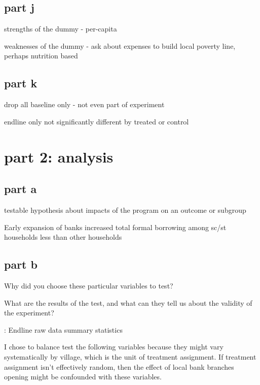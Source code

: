 \documentclass[12pt]{article}
\begin{document}
\subsection{part j}

strengths of the dummy
- per-capita


weaknesses of the dummy
- ask about expenses to build local poverty line, perhaps nutrition based



\subsection{part k}

drop all baseline only - not even part of experiment

endline only not significantly different by treated or control

\section{part 2: analysis}

\subsection{part a}

testable hypothesis about impacts of the program on an outcome or subgroup

Early expansion of banks increased total formal borrowing among sc/st households less than other households

\subsection{part b}

Why did you choose these particular variables to test?

What are the results of the test, and what can they tell us about the validity of the
experiment?




\begin{table}[H]
    \centering
    \scriptsize %
    \setlength{\tabcolsep}{2pt}
    \renewcommand{\arraystretch}{2}
    \resizebox{\textwidth}{!}{}
    \caption{: Endline raw data summary statistics}
\end{table}


I chose to balance test the following variables because they might vary systematically by village, which is the unit of treatment assignment. If treatment assignment isn't effectively random, then the effect of local bank branches opening might be confounded with these variables. 
\end{document}
